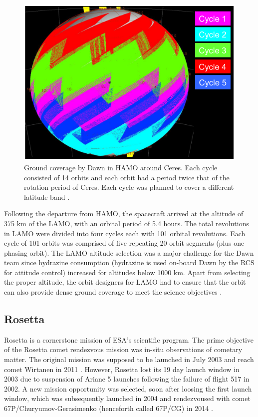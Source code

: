 \begin{figure}[h]
\begin{minipage}[t]{0.45\linewidth}
\includegraphics[width=\textwidth]{hamoatceres.png}
\caption{Ground coverage by Dawn in \gls{HAMO} around Ceres. Each cycle consisted of 14 orbits and each orbit had a period twice that of the rotation period of Ceres. Each cycle was planned to cover a different latitude band \cite{ceresorbits}.}
\label{fig:hamoatceres}
\end{minipage}
\end{figure}

Following the departure from \gls{HAMO}, the spacecraft arrived at the altitude of 375 km of the \gls{LAMO}, with an orbital period of 5.4 hours. The total revolutions in \gls{LAMO} were divided into four cycles each with 101 orbital revolutions. Each cycle of 101 orbits was comprised of five repeating 20 orbit segments (plus one phasing orbit). The \gls{LAMO} altitude selection was a major challenge for the Dawn team since hydrazine consumption (hydrazine is used on-board Dawn by the \gls{RCS} for attitude control) increased for altitudes below 1000 km. Apart from selecting the proper altitude, the orbit designers for \gls{LAMO} had to ensure that the orbit can also provide dense ground coverage to meet the science objectives \cite{ceresorbits}.

\subsection{Rosetta}
\label{rosetta}
Rosetta is a cornerstone mission of \gls{ESA}'s scientific program. The prime objective of the Rosetta comet rendezvous mission was in-situ observations of cometary matter. The original mission was supposed to be launched in July 2003 and reach comet Wirtanen in 2011 \cite{rosettaoldmartin}. However, Rosetta lost its 19 day launch window in 2003 due to suspension of Ariane 5 launches following the failure of flight 517 in 2002. A new mission opportunity was selected, soon after loosing the first launch window, which was subsequently launched in 2004 and rendezvoused with comet 67P/Churyumov-Gerasimenko (henceforth called 67P/CG) in 2014 \cite{rosettanewferri}.

